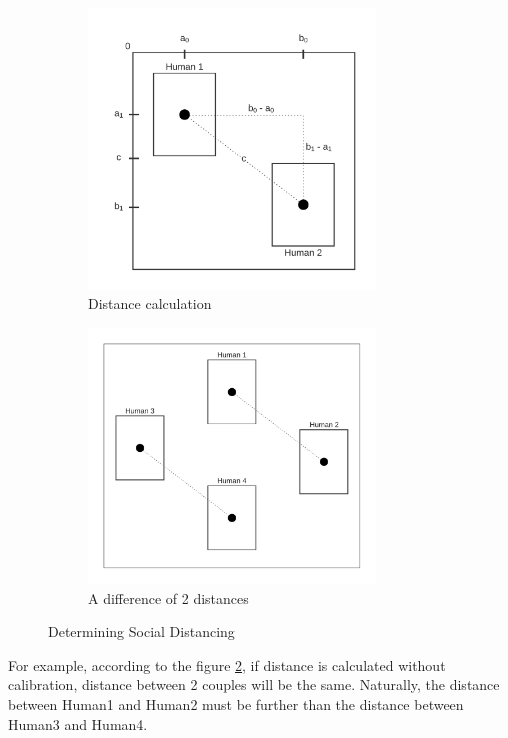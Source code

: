         \begin{figure}
            \centering
            \begin{subfigure}{.5\textwidth}
              \centering
              \includegraphics[width=3in]{images/chapter2/distance.png}
              \caption{Distance calculation}
              \label{distanceCalculation}
            \end{subfigure}%
            \begin{subfigure}{.5\textwidth}
              \centering
              \includegraphics[width=3in]{images/chapter2/two-distances.png}
              \caption{A difference of 2 distances}
              \label{twoDistances}
            \end{subfigure}
            \caption{Determining Social Distancing}
            \label{determiningConcept}
        \end{figure}

        For example, according to the figure \ref{twoDistances},
        if distance is calculated without calibration, distance between 2 couples will be the same.
        Naturally, the distance between Human1 and Human2 must be further than the distance between Human3 and Human4.

